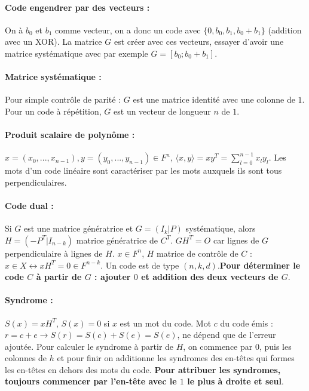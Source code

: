 \documentclass[11pt,a4paper]{report}
\begin{document}
\paragraph*{Code engendrer par des vecteurs :} On à $b_0$ et $b_1$ comme vecteur, on a donc un code avec $\{0,b_0,b_1,b_0+b_1\}$ (addition avec un XOR). La matrice $G$ est créer avec ces vecteurs, essayer d'avoir une matrice systématique avec par exemple $G=[b_0;b_0+b_1]$.

\paragraph*{Matrice systématique :} Pour simple contrôle de parité : $G$ est une matrice identité avec une colonne de $1$. Pour un code à répétition, $G$ est un vecteur de longueur $n$ de $1$.

\paragraph*{Produit scalaire de polynôme :} $x=(x_0,...,x_{n-1}), y=(y_0,...,y_{n-1}) \in F^n$, $\langle x,y\rangle = xy^T=\sum_{l=0}^{n-1}x_l y_l$. Les mots d'un code linéaire sont caractériser par les mots auxquels ils sont tous perpendiculaires.

\paragraph*{Code dual :} Si $G$ est une matrice génératrice et $G=(I_k|P)$ systématique, alors $H=(-P^T|I_{n-k})$ matrice génératrice de $C^T$. $GH^T=O$ car lignes de $G$ perpendiculaire à lignes de $H$. $x\in F^n$, $H$ matrice de contrôle de $C$ : $x\in X \leftrightarrow xH^T = 0 \in F^{n-k}$. Un code est de type $(n,k,d)$.\textbf{Pour déterminer le code $C$ à partir de $G$ : ajouter $0$ et addition des deux vecteurs de $G$}.

\paragraph*{Syndrome :} $S(x) = xH^T$, $S(x)=0$ si $x$ est un mot du code. Mot $c$ du code émis : $r=c+e \rightarrow S(r)=S(c)+S(e)=S(e)$, ne dépend que de l'erreur ajoutée. Pour calculer le syndrome à partir de $H$, on commence par $0$, puis les colonnes de $h$ et pour finir on additionne les syndromes des en-têtes qui formes les en-têtes en dehors des mots du code. \textbf{Pour attribuer les syndromes, toujours commencer par l'en-tête avec le $1$ le plus à droite et seul}.
\end{document}
